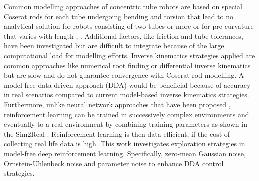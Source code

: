 Common modelling approaches of concentric tube robots are based on special Coserat rods for each tube undergoing bending and torsion that lead to no analytical solution for robots consisting of two tubes or more or for pre-curvature that varies with length \cite{Dupont2010}, \cite{Rucker2010}. Additional factors, like friction and tube tolerances, have been investigated \cite{Lock2011} but are difficult to integrate because of the large computational load for modelling efforts. Inverse kinematics strategies applied are common approaches like numerical root finding \cite{Burgner2014} or differential inverse kinematics \cite{Dupont2010} but are slow and do not guarantee convergence with Coserat rod modelling. 
A model-free data driven approach (DDA) would be beneficial because of accuracy in real scenarios compared to current model-based inverse kinematics strategies. Furthermore, unlike neural network approaches that have been proposed \cite{Grassmann2018}, reinforcement learning can be trained in successively complex environments and eventually to a real environment by combining training parameters as shown in the Sim2Real \cite{OpenAI2018}. Reinforcement learning is then data efficient, if the cost of collecting real life data is high. This work investigates exploration strategies in model-free deep reinforcement learning. Specifically, zero-mean Gaussian noise, Ornstein-Uhlenbeck noise and parameter noise to enhance DDA control strategies.
